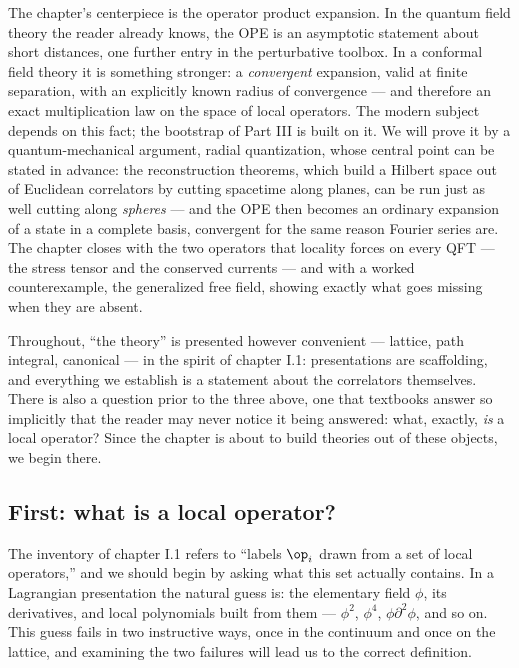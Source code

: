 \noin The chapter's centerpiece is the operator product expansion. In the
quantum field theory the reader already knows, the OPE is an asymptotic
statement about short distances, one further entry in the perturbative
toolbox. In a conformal field theory it is something stronger: a
\emph{convergent} expansion, valid at finite separation, with an explicitly
known radius of convergence --- and therefore an exact multiplication law on
the space of local operators. The modern subject depends on this fact; the
bootstrap of Part III is built on it. We will prove it by a
quantum-mechanical argument, radial quantization, whose central point can be
stated in advance: the reconstruction theorems, which build a Hilbert space
out of Euclidean correlators by cutting spacetime along planes, can be run
just as well cutting along \emph{spheres} --- and the OPE then becomes an
ordinary expansion of a state in a complete basis, convergent for the same
reason Fourier series are. The chapter closes with the two operators that
locality forces on every QFT --- the stress tensor and the conserved currents
--- and with a worked counterexample, the generalized free field, showing
exactly what goes missing when they are absent.

Throughout, ``the theory'' is presented however convenient --- lattice, path
integral, canonical --- in the spirit of chapter I.1: presentations are
scaffolding, and everything we establish is a statement about the correlators
themselves. There is also a question prior to the three above, one that
textbooks answer so implicitly that the reader may never notice it being
answered: what, exactly, \emph{is} a local operator? Since the chapter is
about to build theories out of these objects, we begin there.

\subsection{First: what is a local operator?}
\label{sec:what-is-operator}

The inventory of chapter I.1 refers to ``labels $\op_i$ drawn from a set of
local operators,'' and we should begin by asking what this set actually
contains. In a Lagrangian presentation the natural guess is: the elementary
field $\phi$, its derivatives, and local polynomials built from them ---
$\phi^2$, $\phi^4$, $\phi\partial^2\phi$, and so on. This guess fails in
two instructive ways, once in the continuum and once on the lattice, and
examining the two failures will lead us to the correct definition.

